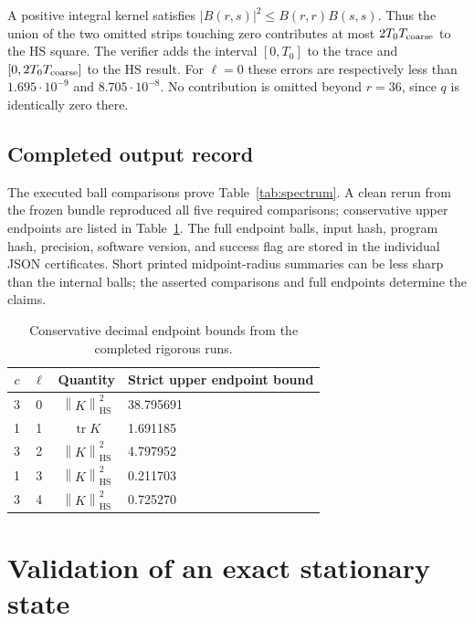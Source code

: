 \documentclass[11pt,a4paper]{article}
\theoremstyle{definition}\newtheorem{definition}[theorem]{Definition}
\theoremstyle{remark}\newtheorem{remark}[theorem]{Remark}
\newcommand{\norm}[1]{\left\|#1\right\|}
\newcommand{\tr}{\operatorname{tr}}
\newcommand{\HS}{\mathrm{HS}}
\begin{document}
A positive integral kernel satisfies \(|B(r,s)|^2\le B(r,r)B(s,s)\). Thus the union of the two omitted strips touching zero contributes at most \(2T_0T_{\rm coarse}\) to the HS square. The verifier adds the interval \([0,T_0]\) to the trace and \([0,2T_0T_{\rm coarse}]\) to the HS result. For \(\ell=0\) these errors are respectively less than \(1.695\cdot10^{-9}\) and \(8.705\cdot10^{-8}\). No contribution is omitted beyond \(r=36\), since \(q\) is identically zero there.

\subsection{Completed output record}
The executed ball comparisons prove Table~\ref{tab:spectrum}. A clean rerun from the frozen bundle reproduced all five required comparisons; conservative upper endpoints are listed in Table~\ref{tab:actual}. The full endpoint balls, input hash, program hash, precision, software version, and success flag are stored in the individual JSON certificates. Short printed midpoint-radius summaries can be less sharp than the internal balls; the asserted comparisons and full endpoints determine the claims.
\begin{table}[ht]
\centering\small
\begin{tabular}{@{}cccl@{}}
\toprule
\(c\)&\(\ell\)&Quantity&Strict upper endpoint bound\\\midrule
3&0&\(\norm K_\HS^2\)&38.795691\\
1&1&\(\tr K\)&1.691185\\
3&2&\(\norm K_\HS^2\)&4.797952\\
1&3&\(\norm K_\HS^2\)&0.211703\\
3&4&\(\norm K_\HS^2\)&0.725270\\\bottomrule
\end{tabular}
\caption{Conservative decimal endpoint bounds from the completed rigorous runs.}\label{tab:actual}
\end{table}

\section{Validation of an exact stationary state}
\end{document}

